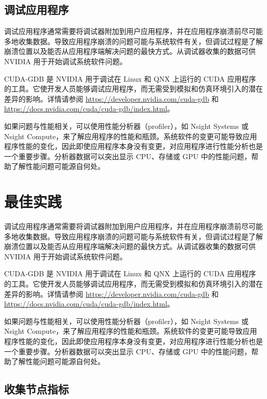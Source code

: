 \documentclass[11pt,UTF8,fontset=fandol,openany]{ctexrep}
\begin{document}
\section{调试应用程序}

调试应用程序通常需要将调试器附加到用户应用程序，并在应用程序崩溃前尽可能多地收集数据。导致应用程序崩溃的问题可能与系统软件有关，但调试过程是了解崩溃位置以及能否从应用程序端解决问题的最快方式。从调试器收集的数据可供 NVIDIA 用于开始调试系统软件问题。

CUDA-GDB 是 NVIDIA 用于调试在 Linux 和 QNX 上运行的 CUDA 应用程序的工具。它使开发人员能够调试应用程序，而无需受到模拟和仿真环境引入的潜在差异的影响。详情请参阅 \url{https://developer.nvidia.com/cuda-gdb} 和 \url{https://docs.nvidia.com/cuda/cuda-gdb/index.html}。

如果问题与性能相关，可以使用性能分析器（profiler），如 Nsight Systems 或 Nsight Compute，来了解应用程序的性能和瓶颈。系统软件的变更可能导致应用程序性能的变化，因此即使应用程序本身没有变更，对应用程序进行性能分析也是一个重要步骤。分析器数据可以突出显示 CPU、存储或 GPU 中的性能问题，帮助了解性能问题可能源自何处。

\newpage

\chapter{最佳实践}

调试应用程序通常需要将调试器附加到用户应用程序，并在应用程序崩溃前尽可能多地收集数据。导致应用程序崩溃的问题可能与系统软件有关，但调试过程是了解崩溃位置以及能否从应用程序端解决问题的最快方式。从调试器收集的数据可供 NVIDIA 用于开始调试系统软件问题。

CUDA-GDB 是 NVIDIA 用于调试在 Linux 和 QNX 上运行的 CUDA 应用程序的工具。它使开发人员能够调试应用程序，而无需受到模拟和仿真环境引入的潜在差异的影响。详情请参阅 \url{https://developer.nvidia.com/cuda-gdb} 和 \url{https://docs.nvidia.com/cuda/cuda-gdb/index.html}。

如果问题与性能相关，可以使用性能分析器（profiler），如 Nsight Systems 或 Nsight Compute，来了解应用程序的性能和瓶颈。系统软件的变更可能导致应用程序性能的变化，因此即使应用程序本身没有变更，对应用程序进行性能分析也是一个重要步骤。分析器数据可以突出显示 CPU、存储或 GPU 中的性能问题，帮助了解性能问题可能源自何处。

\section{收集节点指标}
\end{document}
